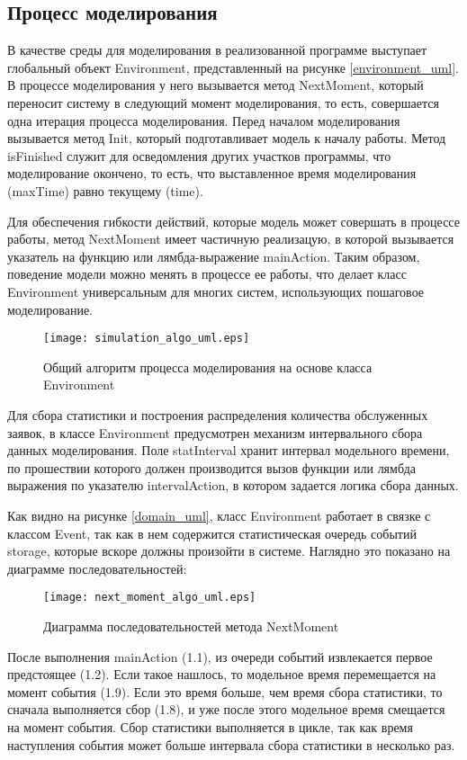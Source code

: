 \subsection{Процесс моделирования}
В качестве среды для моделирования в реализованной программе выступает глобальный объект Environment, представленный на рисунке \ref{environment_uml}. В процессе моделирования у него вызывается метод NextMoment, который переносит систему в следующий момент моделирования, то есть, совершается одна итерация процесса моделирования. Перед началом моделирования вызывается метод Init, который подготавливает модель к началу работы. Метод isFinished служит для осведомления других участков программы, что моделирование окончено, то есть, что выставленное время моделирования (maxTime) равно текущему (time).

Для обеспечения гибкости действий, которые модель может совершать в процессе работы, метод NextMoment имеет частичную реализацую, в которой вызывается указатель на функцию или лямбда-выражение mainAction. Таким образом, поведение модели можно менять в процессе ее работы, что делает класс Environment универсальным для многих систем, использующих пошаговое моделирование.
\begin{figure}[H]
	\centering
	\texttt{[image: simulation\_algo\_uml.eps]}
	\caption{Общий алгоритм процесса моделирования на основе класса Environment}
	\label{simulation_algo_uml}
\end{figure}

Для сбора статистики и построения распределения количества обслуженных заявок, в классе Environment предусмотрен механизм интервального сбора данных моделирования. Поле statInterval хранит интервал модельного времени, по прошествии которого должен производится вызов функции или лямбда выражения по указателю intervalAction, в котором задается логика сбора данных.

Как видно на рисунке \ref{domain_uml}, класс Environment работает в связке с классом Event, так как в нем содержится статистическая очередь событий storage, которые вскоре должны произойти в системе. Наглядно это показано на диаграмме последовательностей:
\begin{figure}[H]
	\centering
	\texttt{[image: next\_moment\_algo\_uml.eps]}
	\caption{Диаграмма последовательностей метода NextMoment}
	\label{next_moment_algo_uml}
\end{figure}
После выполнения mainAction (1.1), из очереди событий извлекается первое предстоящее (1.2). Если такое нашлось, то модельное время перемещается на момент события (1.9). Если это время больше, чем время сбора статистики, то сначала выполняется сбор (1.8), и уже после этого модельное время смещается на момент события. Сбор статистики выполняется в цикле, так как время наступления события может больше интервала сбора статистики в несколько раз.
\clearpage
